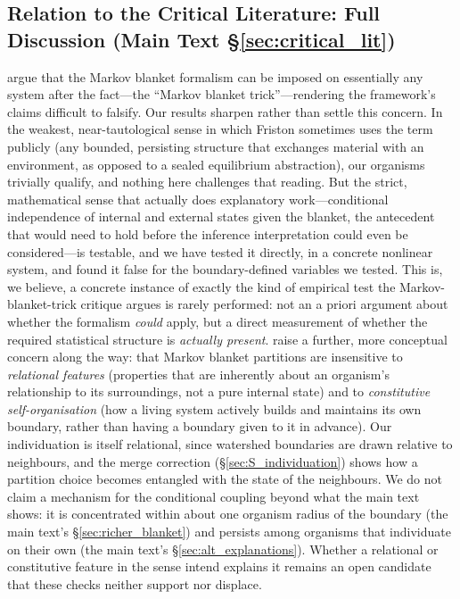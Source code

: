 \documentclass[11pt]{article}
\begin{document}
\subsection{Relation to the Critical Literature: Full Discussion (Main Text \S\ref{sec:critical_lit})}
\label{sec:S_critical_lit}

\citet{Raja2021} argue that the Markov blanket formalism can be imposed on essentially any system after the fact---the ``Markov blanket trick''---rendering the framework's claims difficult to falsify. Our results sharpen rather than settle this concern. In the weakest, near-tautological sense in which Friston sometimes uses the term publicly (any bounded, persisting structure that exchanges material with an environment, as opposed to a sealed equilibrium abstraction), our organisms trivially qualify, and nothing here challenges that reading. But the strict, mathematical sense that actually does explanatory work---conditional independence of internal and external states given the blanket, the antecedent that would need to hold before the inference interpretation could even be considered---is testable, and we have tested it directly, in a concrete nonlinear system, and found it false for the boundary-defined variables we tested. This is, we believe, a concrete instance of exactly the kind of empirical test the Markov-blanket-trick critique argues is rarely performed: not an a priori argument about whether the formalism \emph{could} apply, but a direct measurement of whether the required statistical structure is \emph{actually present}. \citeauthor{Raja2021} raise a further, more conceptual concern along the way: that Markov blanket partitions are insensitive to \emph{relational features} (properties that are inherently about an organism's relationship to its surroundings, not a pure internal state) and to \emph{constitutive self-organisation} (how a living system actively builds and maintains its own boundary, rather than having a boundary given to it in advance). Our individuation is itself relational, since watershed boundaries are drawn relative to neighbours, and the merge correction (\S\ref{sec:S_individuation}) shows how a partition choice becomes entangled with the state of the neighbours. We do not claim a mechanism for the conditional coupling beyond what the main text shows: it is concentrated within about one organism radius of the boundary (the main text's \S\ref{sec:richer_blanket}) and persists among organisms that individuate on their own (the main text's \S\ref{sec:alt_explanations}). Whether a relational or constitutive feature in the sense \citeauthor{Raja2021} intend explains it remains an open candidate that these checks neither support nor displace.
\end{document}
